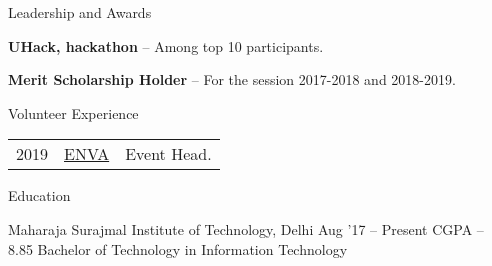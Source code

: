\documentclass{resume} %
\begin{document}

\begin{rSection}{Leadership and Awards}
  \begin{rProjectSection}
    \item \textbf {UHack, hackathon} -- Among top 10 participants.
  \end{rProjectSection}
  \begin{rProjectSection}
    \item \textbf {Merit Scholarship Holder} -- For the session 2017-2018 and 2018-2019.
  \end{rProjectSection}

\end{rSection}


\begin{rSection}{Volunteer Experience}
  \begin{tabular}{rll}
2019	    & {\href{http://www.msit.in/media/2019/03/20/report-on-enva.pdf}{ENVA}}  & Event Head.\\
\end{tabular}
\end{rSection}


\begin{rSection}{Education}
  \begin{rEducationSection}{Maharaja Surajmal Institute of Technology, Delhi}
                           {Aug '17 -- Present}
                           {CGPA -- 8.85}
                           {Bachelor of Technology in Information Technology}
  \end{rEducationSection}
\end{rSection}
\end{document}
